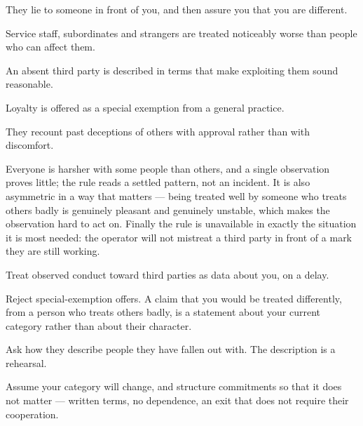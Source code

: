 \begin{feedback}
  \item They lie to someone in front of you, and then assure you that you are different.
  \item Service staff, subordinates and strangers are treated noticeably worse than people who can affect them.
  \item An absent third party is described in terms that make exploiting them sound reasonable.
  \item Loyalty is offered as a special exemption from a general practice.
  \item They recount past deceptions of others with approval rather than with discomfort.
\end{feedback}

\begin{failure}
Everyone is harsher with some people than others, and a single observation proves little; the rule reads a settled pattern, not an incident. It is also asymmetric in a way that matters --- being treated well by someone who treats others badly is genuinely pleasant and genuinely unstable, which makes the observation hard to act on. Finally the rule is unavailable in exactly the situation it is most needed: the operator will not mistreat a third party in front of a mark they are still working.
\end{failure}

\begin{countermeasures}
  \item Treat observed conduct toward third parties as data about you, on a delay.
  \item Reject special-exemption offers. A claim that you would be treated differently, from a person who treats others badly, is a statement about your current category rather than about their character.
  \item Ask how they describe people they have fallen out with. The description is a rehearsal.
  \item Assume your category will change, and structure commitments so that it does not matter --- written terms, no dependence, an exit that does not require their cooperation.
\end{countermeasures}

\seesources
{}
